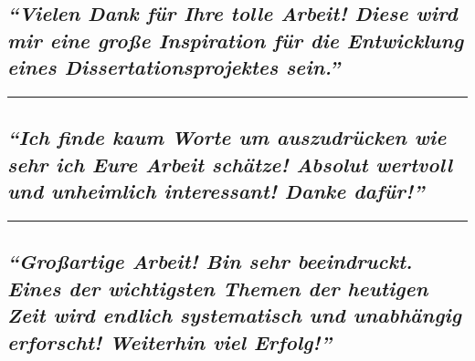 \hypertarget{vielen-dank-fuxfcr-ihre-tolle-arbeit-diese-wird-mir-eine-grouxdfe-inspiration-fuxfcr-die-entwicklung-eines-dissertationsprojektes-sein}{%
\subsection{\texorpdfstring{\emph{``Vielen Dank für Ihre tolle Arbeit!
Diese wird mir eine große Inspiration für die Entwicklung eines
Dissertationsprojektes
sein.''}}{``Vielen Dank für Ihre tolle Arbeit! Diese wird mir eine große Inspiration für die Entwicklung eines Dissertationsprojektes sein.''}}\label{vielen-dank-fuxfcr-ihre-tolle-arbeit-diese-wird-mir-eine-grouxdfe-inspiration-fuxfcr-die-entwicklung-eines-dissertationsprojektes-sein}}

\begin{center}\rule{0.5\linewidth}{\linethickness}\end{center}

\hypertarget{ich-finde-kaum-worte-um-auszudruxfccken-wie-sehr-ich-eure-arbeit-schuxe4tze-absolut-wertvoll-und-unheimlich-interessant-danke-dafuxfcr}{%
\subsection{\texorpdfstring{\emph{``Ich finde kaum Worte um auszudrücken
wie sehr ich Eure Arbeit schätze! Absolut wertvoll und unheimlich
interessant! Danke
dafür!''}}{``Ich finde kaum Worte um auszudrücken wie sehr ich Eure Arbeit schätze! Absolut wertvoll und unheimlich interessant! Danke dafür!''}}\label{ich-finde-kaum-worte-um-auszudruxfccken-wie-sehr-ich-eure-arbeit-schuxe4tze-absolut-wertvoll-und-unheimlich-interessant-danke-dafuxfcr}}

\begin{center}\rule{0.5\linewidth}{\linethickness}\end{center}

\hypertarget{grouxdfartige-arbeit-bin-sehr-beeindruckt-eines-der-wichtigsten-themen-der-heutigen-zeit-wird-endlich-systematisch-und-unabhuxe4ngig-erforscht-weiterhin-viel-erfolg}{%
\subsection{\texorpdfstring{\emph{``Großartige Arbeit! Bin sehr
beeindruckt. Eines der wichtigsten Themen der heutigen Zeit wird endlich
syste­ma­tisch und unabhängig erforscht! Weiterhin viel
Erfolg!''}}{``Großartige Arbeit! Bin sehr beeindruckt. Eines der wichtigsten Themen der heutigen Zeit wird endlich syste­ma­tisch und unabhängig erforscht! Weiterhin viel Erfolg!''}}\label{grouxdfartige-arbeit-bin-sehr-beeindruckt-eines-der-wichtigsten-themen-der-heutigen-zeit-wird-endlich-systematisch-und-unabhuxe4ngig-erforscht-weiterhin-viel-erfolg}}

